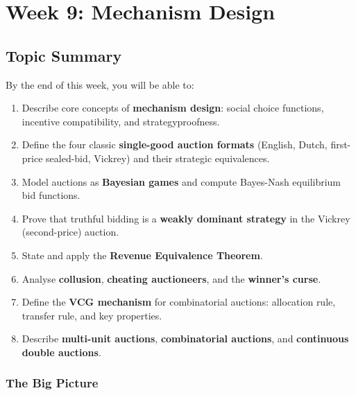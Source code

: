 \section{Week 9: Mechanism Design}

\subsection{Topic Summary}

\begin{keybox}
By the end of this week, you will be able to:
\begin{enumerate}
  \item Describe core concepts of \textbf{mechanism design}: social choice functions, incentive compatibility, and strategyproofness.
  \item Define the four classic \textbf{single-good auction formats} (English, Dutch, first-price sealed-bid, Vickrey) and their strategic equivalences.
  \item Model auctions as \textbf{Bayesian games} and compute Bayes-Nash equilibrium bid functions.
  \item Prove that truthful bidding is a \textbf{weakly dominant strategy} in the Vickrey (second-price) auction.
  \item State and apply the \textbf{Revenue Equivalence Theorem}.
  \item Analyse \textbf{collusion}, \textbf{cheating auctioneers}, and the \textbf{winner's curse}.
  \item Define the \textbf{VCG mechanism} for combinatorial auctions: allocation rule, transfer rule, and key properties.
  \item Describe \textbf{multi-unit auctions}, \textbf{combinatorial auctions}, and \textbf{continuous double auctions}.
\end{enumerate}
\end{keybox}

\separator

\subsubsection*{The Big Picture}

